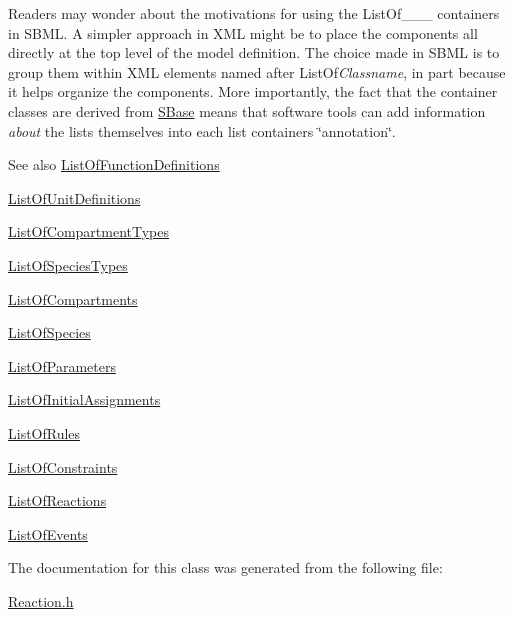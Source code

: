 Readers may wonder about the motivations for using the List\+Of\+\_\+\+\_\+\+\_\+ containers in S\+B\+ML. A simpler approach in X\+ML might be to place the components all directly at the top level of the model definition. The choice made in S\+B\+ML is to group them within X\+ML elements named after List\+Of{\itshape Classname}, in part because it helps organize the components. More importantly, the fact that the container classes are derived from \hyperlink{class_s_base}{S\+Base} means that software tools can add information {\itshape about} the lists themselves into each list container\textquotesingle{}s \char`\"{}annotation\char`\"{}.

\begin{DoxySeeAlso}{See also}
\hyperlink{class_list_of_function_definitions}{List\+Of\+Function\+Definitions} 

\hyperlink{class_list_of_unit_definitions}{List\+Of\+Unit\+Definitions} 

\hyperlink{class_list_of_compartment_types}{List\+Of\+Compartment\+Types} 

\hyperlink{class_list_of_species_types}{List\+Of\+Species\+Types} 

\hyperlink{class_list_of_compartments}{List\+Of\+Compartments} 

\hyperlink{class_list_of_species}{List\+Of\+Species} 

\hyperlink{class_list_of_parameters}{List\+Of\+Parameters} 

\hyperlink{class_list_of_initial_assignments}{List\+Of\+Initial\+Assignments} 

\hyperlink{class_list_of_rules}{List\+Of\+Rules} 

\hyperlink{class_list_of_constraints}{List\+Of\+Constraints} 

\hyperlink{class_list_of_reactions}{List\+Of\+Reactions} 

\hyperlink{class_list_of_events}{List\+Of\+Events} 
\end{DoxySeeAlso}


The documentation for this class was generated from the following file\+:\begin{DoxyCompactItemize}
\item 
\hyperlink{_reaction_8h}{Reaction.\+h}\end{DoxyCompactItemize}
